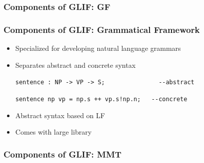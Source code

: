 
\begin{frame}
    \frametitle{Components of GLIF: GF}
    
\end{frame}

\begin{frame}[fragile]
    \frametitle{Components of GLIF: Grammatical Framework \cite{GF:on}}
    \begin{itemize}
        \item Specialized for developing natural language grammars
        \item Separates abstract and concrete syntax\par
            \quad\lstinline[language=GF]|sentence : NP -> VP -> S;               --abstract|\par
            \quad\lstinline[language=GF]|sentence np vp = np.s ++ vp.s!np.n;   --concrete|
        \item Abstract syntax based on LF
        \item Comes with large library 
    \end{itemize}

    \vspace{2em}
    \hspace{2.5em}
\end{frame}

\begin{frame}
    \frametitle{Components of GLIF: MMT}
    
\end{frame}

